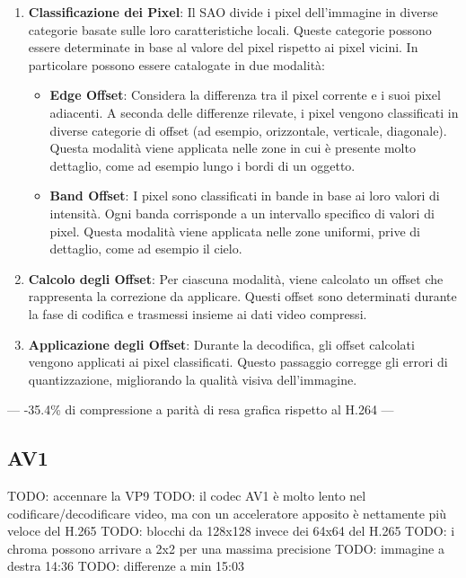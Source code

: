 \documentclass[a4paper,12pt, oneside]{article}
\begin{document}
\begin{enumerate}
    \item \textbf{Classificazione dei Pixel}: Il SAO divide i pixel dell'immagine in diverse categorie basate
    sulle loro caratteristiche locali. Queste categorie possono essere determinate in base al valore del pixel
    rispetto ai pixel vicini. In particolare possono essere catalogate in due modalità:
    
    \begin{itemize}
        \item \textbf{Edge Offset}: Considera la differenza tra il pixel corrente e i suoi pixel adiacenti.
        A seconda delle differenze rilevate, i pixel vengono classificati in diverse categorie di offset (ad
        esempio, orizzontale, verticale, diagonale). Questa modalità viene applicata nelle zone in cui è
        presente molto dettaglio, come ad esempio lungo i bordi di un oggetto.
        
        \item \textbf{Band Offset}: I pixel sono classificati in bande in base ai loro valori di intensità.
        Ogni banda corrisponde a un intervallo specifico di valori di pixel. Questa modalità viene applicata
        nelle zone uniformi, prive di dettaglio, come ad esempio il cielo.
    \end{itemize}
    
    \item \textbf{Calcolo degli Offset}: Per ciascuna modalità, viene calcolato un offset che rappresenta la
    correzione da applicare. Questi offset sono determinati durante la fase di codifica e trasmessi insieme
    ai dati video compressi.
    
    \item \textbf{Applicazione degli Offset}: Durante la decodifica, gli offset calcolati vengono applicati
    ai pixel classificati. Questo passaggio corregge gli errori di quantizzazione, migliorando la qualità
    visiva dell'immagine.
\end{enumerate}

---
-35.4\% di compressione a parità di resa grafica rispetto al H.264
---

\subsection{AV1}
TODO: accennare la VP9
TODO: il codec AV1 è molto lento nel codificare/decodificare video, ma con un acceleratore apposito è nettamente più veloce del H.265
TODO: blocchi da 128x128 invece dei 64x64 del H.265
TODO: i chroma possono arrivare a 2x2 per una massima precisione
TODO: immagine a destra 14:36
TODO: differenze a min 15:03
\end{document}
